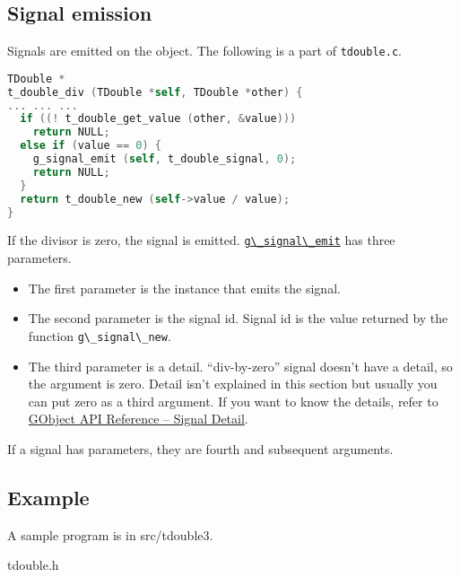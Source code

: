 \subsection{Signal emission}\label{signal-emission}

Signals are emitted on the object. The following is a part of
\passthrough{\lstinline!tdouble.c!}.

\begin{lstlisting}[language=C]
TDouble *
t_double_div (TDouble *self, TDouble *other) {
... ... ...
  if ((! t_double_get_value (other, &value)))
    return NULL;
  else if (value == 0) {
    g_signal_emit (self, t_double_signal, 0);
    return NULL;
  }
  return t_double_new (self->value / value);
}
\end{lstlisting}

If the divisor is zero, the signal is emitted.
\href{https://docs.gtk.org/gobject/func.signal_emit.html}{\passthrough{\lstinline!g\_signal\_emit!}}
has three parameters.

\begin{itemize}
\tightlist
\item
  The first parameter is the instance that emits the signal.
\item
  The second parameter is the signal id. Signal id is the value returned
  by the function \passthrough{\lstinline!g\_signal\_new!}.
\item
  The third parameter is a detail. ``div-by-zero'' signal doesn't have a
  detail, so the argument is zero. Detail isn't explained in this
  section but usually you can put zero as a third argument. If you want
  to know the details, refer to
  \href{https://docs.gtk.org/gobject/concepts.html\#the-detail-argument}{GObject
  API Reference -- Signal Detail}.
\end{itemize}

If a signal has parameters, they are fourth and subsequent arguments.

\subsection{Example}\label{example}

A sample program is in src/tdouble3.

tdouble.h

